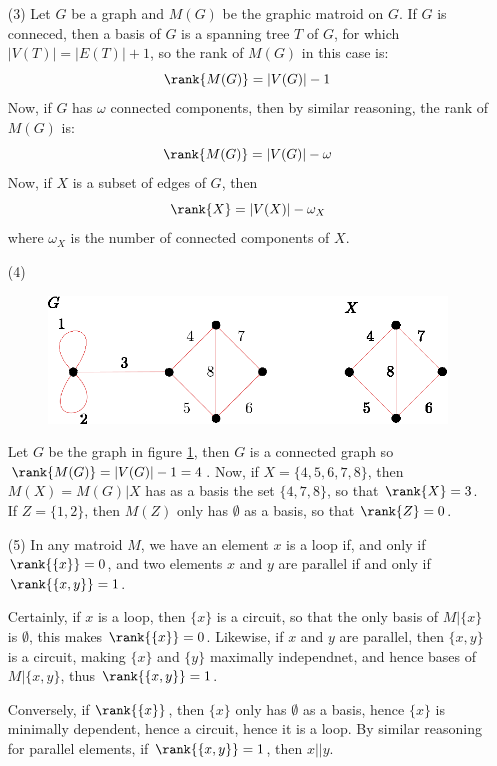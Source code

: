 \begin{example}
\begin{enumerate}
    \item[(3)] Let $G$ be a graph and $M(G)$ be the graphic matroid on $G$. If
        $G$ is conneced, then a basis of  $G$ is a spanning tree  $T$ of  $G$,
        for which  $|V(T)|=|E(T)|+1$, so the rank of $M(G)$ in this case is:
        \begin{equation*}
            \rank{M(G)}=|V(G)|-1
        \end{equation*}
        Now, if $G$ has  $\omega$ connected components, then by similar
        reasoning, the rank of  $M(G)$ is:
        \begin{equation*}
            \rank{M(G)}=|V(G)|-\omega
        \end{equation*}
        Now, if $X$ is a subset of edges of  $G$, then
        \begin{equation*}
            \rank{X}=|V(X)|-\omega_X
        \end{equation*}
        where  $\omega_X$ is the number of connected components of  $X$.

    \item[(4)]
         \begin{figure}[h]
            \centering
            \includegraphics[scale=1.0]{Figures/Chapter1/connected_graph_rank.eps}
            \caption{}
            \label{fig_1.6}
        \end{figure}
        Let $G$ be the graph in figure \ref{fig_1.6}, then $G$ is a connected
        graph so  $\rank{M(G)}=|V(G)|-1=4$. Now, if $X=\{4,5,6,7,8\}$, then
        $M(X)=M(G)|X$ has as a basis the set $\{4,7,8\}$, so that $\rank{X}=3$.
        If $Z=\{1,2\}$, then $M(Z)$ only has $\emptyset$ as a basis, so that
        $\rank{Z}=0$.

    \item[(5)] In any matroid $M$, we have an element $x$ is a loop if, and only
        if  $\rank{\{x\}}=0$, and two elements $x$ and $y$ are parallel if and
        only if $\rank{\{x,y\}}=1$.

        Certainly, if $x$ is a loop, then  $\{x\}$ is a circuit, so that the
        only basis of $M|\{x\}$ is $\emptyset$, this makes  $\rank{\{x\}}=0$.
        Likewise, if $x$ and  $y$ are parallel, then $\{x,y\}$ is a circuit,
        making $\{x\}$ and $\{y\}$ maximally independnet, and hence bases of
        $M|\{x,y\}$, thus $\rank{\{x,y\}}=1$.

        Conversely, if $\rank{\{x\}}$, then $\{x\}$ only has $\emptyset$ as a
        basis, hence $\{x\}$ is minimally dependent, hence a circuit, hence it
        is a loop. By similar reasoning for parallel elements, if
        $\rank{\{x,y\}}=1$, then $x || y$.
    \end{enumerate}
\end{example}

